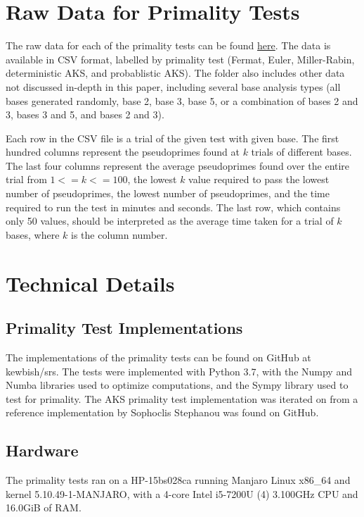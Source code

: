\documentclass{article}
\begin{document}
\appendix
\begin{appendices}
\section{Raw Data for Primality Tests} \label{appendix:data}

The raw data for each of the primality tests can be found \href{https://github.com/kewbish/srs/tree/master/scripts/dataset}{here}. %
The data is available in CSV format, labelled by primality test (Fermat, Euler, Miller-Rabin, deterministic AKS, and probablistic AKS). The folder also includes other data not discussed in-depth in this paper, including several base analysis types (all bases generated randomly, base 2, base 3, base 5, or a combination of bases 2 and 3, bases 3 and 5, and bases 2 and 3).

Each row in the CSV file is a trial of the given test with given base. The first hundred columns represent the pseudoprimes found at $k$ trials of different bases. The last four columns represent the average pseudoprimes found over the entire trial from $1 <= k <= 100$, the lowest $k$ value required to pass the lowest number of pseudoprimes, the lowest number of pseudoprimes, and the time required to run the test in minutes and seconds. 
The last row, which contains only 50 values, should be interpreted as the average time taken for a trial of $k$ bases, where $k$ is the column number.

\section{Technical Details} \label{appendix:tech}

\subsection{Primality Test Implementations}
The implementations of the primality tests can be found on GitHub at kewbish/srs. %
The tests were implemented with Python 3.7, with the Numpy and Numba libraries used to optimize computations, and the Sympy library used to test for primality.
The AKS primality test implementation was iterated on from a reference implementation by Sophoclis Stephanou was found on GitHub. %

\subsection{Hardware}
The primality tests ran on a HP-15bs028ca running Manjaro Linux x86\_64 and kernel 5.10.49-1-MANJARO, with a 4-core Intel i5-7200U (4) 3.100GHz CPU and 16.0GiB of RAM.

\end{appendices}
\end{document}
